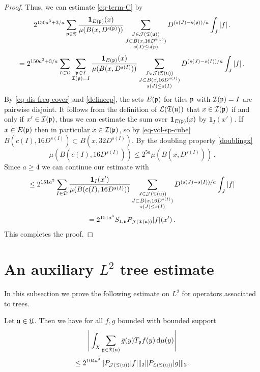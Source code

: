 \begin{proof}
    Thus, we can estimate \eqref{eq-term-C} by
    $$
        2^{150a^3 + 3/a}\sum_{{\mathfrak p}\in \mathfrak{T}}\frac{\mathbf{1}_{E({\mathfrak p})}(x)}{\mu(B(x,D^{{\mathrm{s}}({\mathfrak p})}))}\sum_{\substack{J\in \mathcal{J}({\mathfrak T}({\mathfrak u}))\\J\subset B(x, 16D^{{\mathrm{s}}({\mathfrak p})})\\ s(J) \le {\mathrm{s}}({\mathfrak p})}} D^{(s(J) - {\mathrm{s}}({\mathfrak p}))/a} \int_J |f|\,.
    $$
    $$
        = 2^{150a^3 + 3/a}\sum_{I \in \mathcal{D}} \sum_{\substack{{\mathfrak p}\in \mathfrak{T}\\ {\mathcal{I}}({\mathfrak p}) = I}}\frac{\mathbf{1}_{E({\mathfrak p})}(x)}{\mu(B(x, D^{s(I)}))}\sum_{\substack{J\in \mathcal{J}({\mathfrak T}({\mathfrak u}))\\J\subset B(x, 16 D^{s(I)})\\ s(J) \le s(I)}} D^{(s(J) - s(I))/a} \int_J |f|\,.
    $$
    By \eqref{eq-dis-freq-cover} and \eqref{defineep}, the sets $E({\mathfrak p})$ for tiles ${\mathfrak p}$ with ${\mathcal{I}}({\mathfrak p}) = I$ are pairwise disjoint. It follows from the definition of $\mathcal{L}({\mathfrak T}({\mathfrak u}))$ that $x \in {\mathcal{I}}({\mathfrak p})$ if and only if $x' \in {\mathcal{I}}({\mathfrak p})$, thus we can estimate the sum over $\mathbf{1}_{E({\mathfrak p})}(x)$ by $\mathbf{1}_{I}(x')$.
    If $x \in E({\mathfrak p})$ then in particular $x \in {\mathcal{I}}({\mathfrak p})$, so by \eqref{eq-vol-sp-cube} $B(c(I),16D^{s(I)}) \subset B(x, 32D^{s(I)})$. By the doubling property \eqref{doublingx}
    $$
        \mu(B(c(I), 16D^{s(I)})) \le 2^{5a} \mu(B(x, D^{s(I)}))\,.
    $$
    Since $a \ge 4$ we can continue our estimate with
    $$
        \le 2^{151a^3}\sum_{I \in \mathcal{D}} \frac{\mathbf{1}_{I}(x')}{\mu(B(c(I), 16D^{s(I)}))}\sum_{\substack{J\in \mathcal{J}({\mathfrak T}({\mathfrak u}))\\J\subset B(x, 16 D^{s(I)})\\ s(J) \le s(I)}} D^{(s(J) - s(I))/a} \int_J |f|
    $$
    $$
         = 2^{151a^3} S_{1,{\mathfrak u}} P_{\mathcal{J}({\mathfrak T}({\mathfrak u}))}|f|(x')\,.
    $$
    This completes the proof.
\end{proof}

\section{An auxiliary \texorpdfstring{$L^2$}{L2} tree estimate}

In this subsection we prove the following estimate on $L^2$ for operators associated to trees.

\begin{lemma}
    \label{tree-projection-estimate}
    \leanok
    Let ${\mathfrak u} \in {\mathfrak U}$.
    Then we have for all $f, g$ bounded with bounded support
    $$
        \Bigg|\int_X \sum_{{\mathfrak p} \in {\mathfrak T}({\mathfrak u})} \bar g(y) T_{{\mathfrak p}}f(y) \, \mathrm{d}\mu(y) \Bigg|
    $$
    \begin{equation}
        \label{eq-tree-est}
         \le 2^{104a^3}\|P_{\mathcal{J}({\mathfrak T}({\mathfrak u}))}|f|\|_{2}\|P_{\mathcal{L}({\mathfrak T}({\mathfrak u}))}|g|\|_{2}.
    \end{equation}
\end{lemma}

